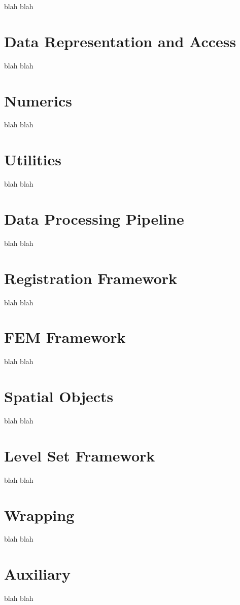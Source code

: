 blah blah

\section{Data Representation and Access}
\label{sec:DataRepresentationAndAccess}

blah blah

\section{Numerics}
\label{sec:Numerics}

blah blah

\section{Utilities}
\label{sec:Utilities}

blah blah

\section{Data Processing Pipeline}
\label{sec:DataProcessingPipeline}

blah blah

\section{Registration Framework}
\label{sec:RegistrationFramework}

blah blah

\section{FEM Framework}
\label{sec:FEMFramework}

blah blah

\section{Spatial Objects}
\label{sec:SpatialObjects}

blah blah

\section{Level Set Framework}
\label{sec:LevelSetFramework}

blah blah

\section{Wrapping}
\label{sec:Wrapping}

blah blah

\section{Auxiliary}
\label{sec:Auxiliary}

blah blah

